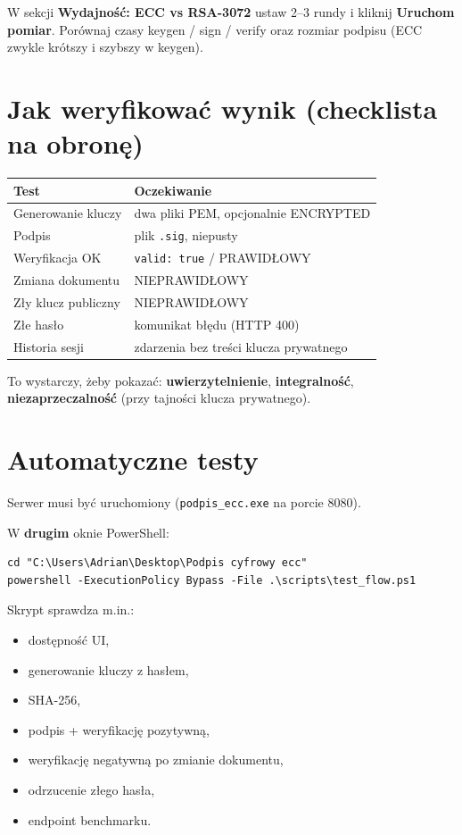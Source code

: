 \documentclass[12pt,a4paper]{article}
\begin{document}
W sekcji \textbf{Wydajność: ECC vs RSA-3072} ustaw 2--3 rundy i kliknij \textbf{Uruchom pomiar}.
Porównaj czasy keygen / sign / verify oraz rozmiar podpisu (ECC zwykle krótszy i szybszy w keygen).

\section{Jak weryfikować wynik (checklista na obronę)}

\begin{table}[h]
\centering
\begin{tabular}{@{}ll@{}}
\toprule
\textbf{Test} & \textbf{Oczekiwanie} \\
\midrule
Generowanie kluczy & dwa pliki PEM, opcjonalnie ENCRYPTED \\
Podpis & plik \texttt{.sig}, niepusty \\
Weryfikacja OK & \texttt{valid: true} / PRAWIDŁOWY \\
Zmiana dokumentu & NIEPRAWIDŁOWY \\
Zły klucz publiczny & NIEPRAWIDŁOWY \\
Złe hasło & komunikat błędu (HTTP 400) \\
Historia sesji & zdarzenia bez treści klucza prywatnego \\
\bottomrule
\end{tabular}
\end{table}

To wystarczy, żeby pokazać: \textbf{uwierzytelnienie}, \textbf{integralność}, \textbf{niezaprzeczalność} (przy tajności klucza prywatnego).

\section{Automatyczne testy}

Serwer musi być uruchomiony (\texttt{podpis\_ecc.exe} na porcie 8080).

W \textbf{drugim} oknie PowerShell:
\begin{verbatim}
cd "C:\Users\Adrian\Desktop\Podpis cyfrowy ecc"
powershell -ExecutionPolicy Bypass -File .\scripts\test_flow.ps1
\end{verbatim}

Skrypt sprawdza m.in.:
\begin{itemize}[leftmargin=*]
  \item dostępność UI,
  \item generowanie kluczy z hasłem,
  \item SHA-256,
  \item podpis + weryfikację pozytywną,
  \item weryfikację negatywną po zmianie dokumentu,
  \item odrzucenie złego hasła,
  \item endpoint benchmarku.
\end{itemize}
\end{document}
